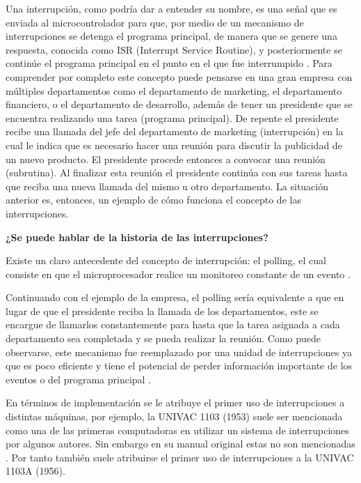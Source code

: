 \documentclass[a4paper,11pt]{article}
\begin{document}
Una interrupción, como podría dar a entender su nombre, es una señal \cite[p.217]{burrell2003fundamentals} que es enviada al microcontrolador para que, por medio de un mecanismo de interrupciones \cite[p.217]{burrell2003fundamentals} se detenga el programa principal, de manera que se genere una respuesta, conocida como ISR (Interrupt Service Routine), y posteriormente se continúe el programa principal en el punto en el que fue interrumpido \cite[p.1]{reyes2015arduino}.
Para comprender por completo este concepto puede pensarse en una gran empresa con múltiples departamentos como el departamento de marketing, el departamento financiero, o el departamento de desarrollo, además de tener un presidente que se encuentra realizando una tarea (programa principal). De repente el presidente recibe una llamada del jefe del departamento de marketing (interrupción) en la cual le indica que es necesario hacer una reunión para discutir la publicidad de un nuevo producto. El presidente procede entonces a convocar una reunión (subrutina). Al finalizar esta reunión el presidente continúa con sus tareas hasta que reciba una nueva llamada del mismo u otro departamento. La situación anterior es, entonces, un ejemplo de cómo funciona el concepto de las interrupciones.



{\large\bfseries ¿Se puede hablar de la historia de las interrupciones?} 

Existe un claro antecedente del concepto de interrupción: el polling, el cual consiste en que el microprocesador realice un monitoreo constante de un evento \cite[p.1]{reyes2015arduino}. 

Continuando con el ejemplo de la empresa, el polling sería equivalente a que en lugar de que el presidente reciba la llamada de los departamentos, este se encargue de llamarlos constantemente para hasta que la tarea asignada a cada departamento sea completada y se pueda realizar la reunión. Como puede observarse, este mecanismo fue reemplazado por una unidad de interrupciones ya que es poco eficiente y tiene el potencial de perder información importante de los eventos o del programa principal \cite[p.2]{reyes2015arduino}.

En términos de implementación se le atribuye el primer uso de interrupciones a distintas máquinas, por ejemplo, la UNIVAC 1103 (1953) suele ser mencionada como una de las primeras computadoras en utilizar un sistema de interrupciones \cite[p.181]{historia1}por algunos autores. Sin embargo en su manual original estas no son mencionadas \cite{smotherman_2017}. Por tanto también suele atribuirse el primer uso de interrupciones a la UNIVAC 1103A (1956)\cite{smotherman_2017}\cite{historia2}.
\end{document}

